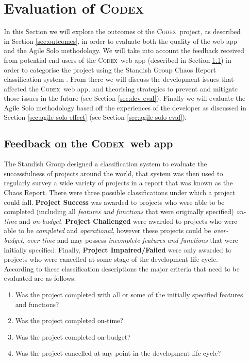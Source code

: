 \documentclass[final]{cmpreport}
\newcommand{\Codex}{\textsc{Codex}}
\begin{document}
	\section{Evaluation of \Codex} \label{sec:evaluation}
	In this Section we will explore the outcomes of the \Codex \ project, as described in Section \ref{sec:outcomes}, in order to evaluate both the quality of the web app and the Agile Solo methodology. We will take into account the feedback received from potential end-users of the \Codex \ web app (described in Section \ref{sec:feedback}) in order to categorise the project using the Standish Group Chaos Report classification system \citep{chaos-report}. From there we will discuss the development issues that affected the \Codex \ web app, and theorising strategies to prevent and mitigate those issues in the future (see Section \ref{sec:dev-eval}). Finally we will evaluate the Agile Solo methodology based off the experiences of the developer as discussed in Section \ref{sec:agile-solo-effect} (see Section \ref{sec:agile-solo-eval}). 
	
		\subsection{Feedback on the \Codex \ web app} \label{sec:feedback}
		The Standish Group designed a classification system to evaluate the successfulness of projects around the world, that system was then used to regularly survey a wide variety of projects in a report that was known as the Chaos Report. There were three possible classifications under which a project could fall. \textbf{Project Success} was awarded to projects who were able to be completed (including all \textit{features and functions} that were originally specified) \textit{on-time} and \textit{on-budget}. \textbf{Project Challenged} were awarded to projects who were able to be \textit{completed} and \textit{operational}, however these projects could be \textit{over-budget}, \textit{over-time} and may possess \textit{incomplete features and functions} that were initially specified. Finally, \textbf{Project Impaired/Failed} were only awarded to projects who were cancelled at some stage of the development life cycle. According to these classification descriptions the major criteria that need to be evaluated are as follows:
		
		\begin{enumerate}
			\item Was the project completed with all or some of the initially specified features and functions?
			\item Was the project completed on-time?
			\item Was the project completed on-budget?
			\item Was the project cancelled at any point in the development life cycle?
		\end{enumerate}
	
\end{document}
